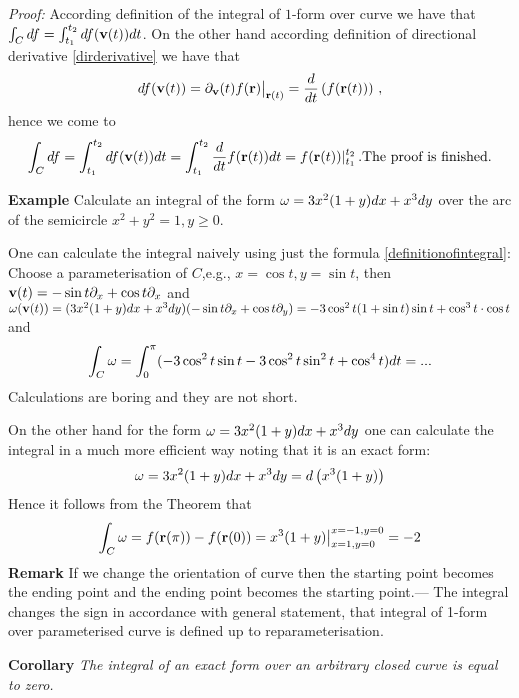 \documentclass[12pt]{article}
\numberwithin{equation}{section}
\begin{document}
\textsl{Proof:}    According definition of the integral of $1$-form over curve
we have that 
 $\int_C df=\int_{t_1}^{t_2}df({\bf v}(t))dt$.  On the other hand
according definition of directional derivative \eqref{dirderivative}
we have that
              $$
   df({\bf v}(t))=\partial_{\bf v}(t) f({\bf r})\big\vert_{{\bf r}(t)}={d\over dt}
   \left(f({\bf r}(t))\right)\,,
              $$
hence  we come to
                       $$
\int_C df=\int_{t_1}^{t_2}df({\bf v}(t))dt=
  \int_{t_1}^{t_2}{d\over dt}f({\bf r}(t))dt=f({\bf r}(t))\vert_{t_1}^{t_2}\,.
\hbox {The proof is finished.}
        $$



\m

{\bf Example} Calculate an integral of the form ${\omega}=3x^2(1+y)dx+x^3dy$ over the arc  of the semicircle
$x^2+y^2=1, y\geq 0$.

One can calculate the integral naively using just the formula \eqref{definitionofintegral}:
Choose a parameterisation of $C$,e.g., $x=\cos t,y=\sin t$, then ${\bf v}(t)=-\sin t\partial_x+\cos t\partial_x$ and
${\omega}({\bf v}(t))=(3x^2(1+y)dx+x^3dy)(-\sin t\partial_x+\cos t\partial_y)=-3\cos^2 t(1+\sin t)\sin t+\cos^3 t\cdot \cos t$ and
                 \begin{equation*}\label{naivecalculofintegral}
    \int_C {\omega}=\int_0^{\pi}(-3\cos^2 t\sin t-3\cos^2t\sin^2 t+\cos^4 t)dt=...
\end{equation*}
Calculations are boring and they are not short.

On the other hand for the form ${\omega}=3x^2(1+y)dx+x^3dy$ 
one can calculate the integral in
a much more efficient way noting that
it is an exact form:
\begin{equation}\label{thisformisexact}
    {\omega}=3x^2(1+y)dx+x^3dy=d\left(x^3(1+y)\right)
\end{equation}
Hence it follows from the Theorem that
\begin{equation}\label{notnaiveclalculations}
        \int_C {\omega}=f({\bf r}(\pi))-f({\bf r}(0))=x^3(1+y)\big\vert^{x=-1,y=0}_{x=1,y=0}=-2
\end{equation}
{\bf Remark} If  we change the orientation of curve then the starting point becomes the ending point
 and the ending point becomes the starting point.--- The integral changes the sign in accordance
  with general statement, that integral of 1-form over parameterised curve is defined up
  to reparameterisation.

  \bigskip


{\bf Corollary} {\it The integral of an exact form over an arbitrary closed curve is equal to zero.}
\end{document}
